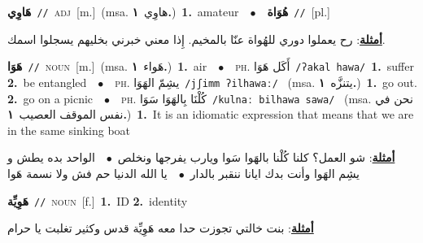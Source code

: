\documentclass[10pt,a4paper,twoside]{article} %
\begin{document}
\begin{multicols}{2}
{\setlength\topsep{0pt}\textbf{\foreignlanguage{arabic}{هَاوِي}}\ {\color{gray}\texttt{//}\color{black}}\ \textsc{adj}\ [m.]\ \color{gray}(msa. \foreignlanguage{arabic}{هاوِي}~\foreignlanguage{arabic}{\textbf{١.}})\color{black}\ \textbf{1.}~amateur\ \ $\bullet$\ \ \setlength\topsep{0pt}\textbf{\foreignlanguage{arabic}{هُوَاة}}\ {\color{gray}\texttt{//}\color{black}}\ [pl.]\  \begin{flushright}\color{gray}\foreignlanguage{arabic}{\textbf{\underline{\foreignlanguage{arabic}{أمثلة}}}: رح يعملوا دوري للهُواة عنّا بالمخيم. إِذا معني خبرني بخليهم يسجلوا اسمك.}\end{flushright}\color{black}} \vspace{2mm}

{\setlength\topsep{0pt}\textbf{\foreignlanguage{arabic}{هَوَا}}\ {\color{gray}\texttt{//}\color{black}}\ \textsc{noun}\ [m.]\ \color{gray}(msa. \foreignlanguage{arabic}{هَواء}~\foreignlanguage{arabic}{\textbf{١.}})\color{black}\ \textbf{1.}~air\ \ $\bullet$\ \ \textsc{ph.} \color{gray} \foreignlanguage{arabic}{أَكَل هَوَا}\color{black}\ {\color{gray}\texttt{/{\sffamily ʔakal hawa}/}\color{black}}\ \textbf{1.}~suffer  \textbf{2.}~be entangled\ \ $\bullet$\ \ \textsc{ph.} \color{gray} \foreignlanguage{arabic}{يشِمّ الهَوَا}\color{black}\ {\color{gray}\texttt{/{\sffamily jʃimm ʔilhawaː}/}\color{black}}\ \color{gray} (msa. \foreignlanguage{arabic}{يتنزَّه}~\foreignlanguage{arabic}{\textbf{١.}})\color{black}\ \textbf{1.}~go out.  \textbf{2.}~go on a picnic\ \ $\bullet$\ \ \textsc{ph.} \color{gray} \foreignlanguage{arabic}{كُلْنَا بِالهَوَا سَوَا}\color{black}\ {\color{gray}\texttt{/{\sffamily kulnaː bilhawa sawa}/}\color{black}}\ \color{gray} (msa. \foreignlanguage{arabic}{نحن في نفس الموقف العصيب}~\foreignlanguage{arabic}{\textbf{١.}})\color{black}\ \textbf{1.}~It is an idiomatic expression that means that we are in the same sinking boat\  \begin{flushright}\color{gray}\foreignlanguage{arabic}{\textbf{\underline{\foreignlanguage{arabic}{أمثلة}}}: شو العمل؟ كلنا كُلْنا بالهَوا سَوا ويارب يفرجها ونخلص\ $\bullet$\ \  الواحد بده يطش و يشِم الهَوا وأنت بدك ايانا ننقبر بالدار\ $\bullet$\ \  يا الله الدنيا حم فش ولا نسمة هَوا}\end{flushright}\color{black}} \vspace{2mm}

{\setlength\topsep{0pt}\textbf{\foreignlanguage{arabic}{هَوِيِّة}}\ {\color{gray}\texttt{//}\color{black}}\ \textsc{noun}\ [f.]\ \textbf{1.}~ID  \textbf{2.}~identity\  \begin{flushright}\color{gray}\foreignlanguage{arabic}{\textbf{\underline{\foreignlanguage{arabic}{أمثلة}}}: بنت خالتي تجوزت حدا معه هَوِيِّة قدس وكثير تغلبت يا حرام}\end{flushright}\color{black}} \vspace{2mm}


\end{multicols}
\end{document}
